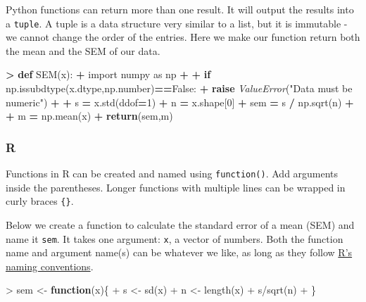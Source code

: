 \documentclass[
]{book}
\newenvironment{Shaded}{\begin{snugshade}}{\end{snugshade}}
\newcommand{\ControlFlowTok}[1]{\textcolor[rgb]{0.13,0.29,0.53}{\textbf{#1}}}
\newcommand{\DecValTok}[1]{\textcolor[rgb]{0.00,0.00,0.81}{#1}}
\newcommand{\FunctionTok}[1]{\textcolor[rgb]{0.00,0.00,0.00}{#1}}
\newcommand{\ImportTok}[1]{#1}
\newcommand{\KeywordTok}[1]{\textcolor[rgb]{0.13,0.29,0.53}{\textbf{#1}}}
\newcommand{\NormalTok}[1]{#1}
\newcommand{\OperatorTok}[1]{\textcolor[rgb]{0.81,0.36,0.00}{\textbf{#1}}}
\newcommand{\OtherTok}[1]{\textcolor[rgb]{0.56,0.35,0.01}{#1}}
\newcommand{\PreprocessorTok}[1]{\textcolor[rgb]{0.56,0.35,0.01}{\textit{#1}}}
\newcommand{\SpecialCharTok}[1]{\textcolor[rgb]{0.00,0.00,0.00}{#1}}
\newcommand{\StringTok}[1]{\textcolor[rgb]{0.31,0.60,0.02}{#1}}
\newcommand{\VariableTok}[1]{\textcolor[rgb]{0.00,0.00,0.00}{#1}}
\begin{document}
Python functions can return more than one result. It will output the results into a \texttt{tuple}. A tuple is a data structure very similar to a list, but it is immutable - we cannot change the order of the entries. Here we make our function return both the mean and the SEM of our data.

\begin{Shaded}
\begin{Highlighting}[]
\OperatorTok{\textgreater{}} \KeywordTok{def}\NormalTok{ SEM(x):}
\OperatorTok{+}   \ImportTok{import}\NormalTok{ numpy }\ImportTok{as}\NormalTok{ np}
\OperatorTok{+}   
\OperatorTok{+}   \ControlFlowTok{if}\NormalTok{ np.issubdtype(x.dtype,np.number)}\OperatorTok{==}\VariableTok{False}\NormalTok{:}
\OperatorTok{+}     \ControlFlowTok{raise} \PreprocessorTok{ValueError}\NormalTok{(}\StringTok{"Data must be numeric"}\NormalTok{)}
\OperatorTok{+}   
\OperatorTok{+}\NormalTok{   s }\OperatorTok{=}\NormalTok{ x.std(ddof}\OperatorTok{=}\DecValTok{1}\NormalTok{) }
\OperatorTok{+}\NormalTok{   n }\OperatorTok{=}\NormalTok{ x.shape[}\DecValTok{0}\NormalTok{] }
\OperatorTok{+}\NormalTok{   sem }\OperatorTok{=}\NormalTok{ s }\OperatorTok{/}\NormalTok{ np.sqrt(n) }
\OperatorTok{+}   
\OperatorTok{+}\NormalTok{   m }\OperatorTok{=}\NormalTok{ np.mean(x)}
\OperatorTok{+}   \ControlFlowTok{return}\NormalTok{(sem,m) }
\end{Highlighting}
\end{Shaded}

\hypertarget{r-7}{%
\subsubsection*{R}\label{r-7}}

Functions in R can be created and named using \texttt{function()}. Add arguments inside the parentheses. Longer functions with multiple lines can be wrapped in curly braces \texttt{\{\}}.

Below we create a function to calculate the standard error of a mean (SEM) and name it \texttt{sem}. It takes one argument: \texttt{x}, a vector of numbers. Both the function name and argument name(s) can be whatever we like, as long as they follow \href{https://cran.r-project.org/doc/manuals/r-release/R-intro.html\#R-commands_003b-case-sensitivity-etc}{R's naming conventions}.

\begin{Shaded}
\begin{Highlighting}[]
\SpecialCharTok{\textgreater{}}\NormalTok{ sem }\OtherTok{\textless{}{-}} \ControlFlowTok{function}\NormalTok{(x)\{}
\SpecialCharTok{+}\NormalTok{   s }\OtherTok{\textless{}{-}} \FunctionTok{sd}\NormalTok{(x)}
\SpecialCharTok{+}\NormalTok{   n }\OtherTok{\textless{}{-}} \FunctionTok{length}\NormalTok{(x)}
\SpecialCharTok{+}\NormalTok{   s}\SpecialCharTok{/}\FunctionTok{sqrt}\NormalTok{(n)}
\SpecialCharTok{+}\NormalTok{ \}}
\end{Highlighting}
\end{Shaded}
\end{document}
